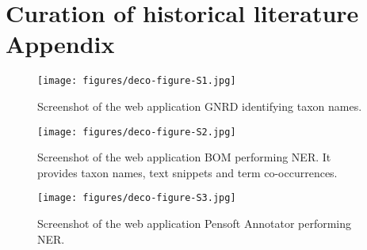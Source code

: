 
\chapter{Curation of historical literature Appendix} %

\label{AppendixB} 

   \begin{figure}[ht]
      \centering
      \texttt{[image: figures/deco-figure-S1.jpg]}
      \caption[GNRD taxon names identification]{Screenshot of the web application GNRD identifying taxon names.}
      \label{fig:gnrd-screenshot}
   \end{figure}

   \begin{figure}[ht]
      \centering
      \texttt{[image: figures/deco-figure-S2.jpg]}
      \caption[BOM performing NER]{Screenshot of the web application BOM performing NER. It provides taxon names, text snippets and term co-occurrences.}
      \label{fig:bom-screenshot}
   \end{figure}
   
   \begin{figure}[ht]
      \centering
      \texttt{[image: figures/deco-figure-S3.jpg]}
      \caption[Pensoft Annotator performing NER]{Screenshot of the web application Pensoft Annotator performing NER.}
      \label{fig:pensoft-annotator-screenshot}
   \end{figure}
